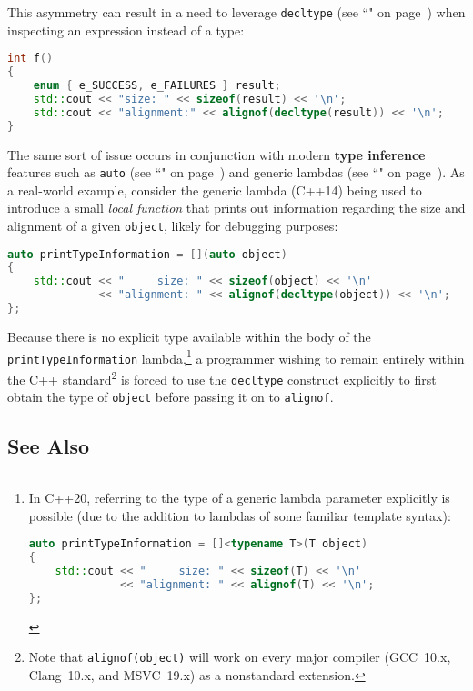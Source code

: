 \noindent This asymmetry can result in a need to leverage
\texttt{decltype} (see ``" on page~\pageref{decltype}) when inspecting an expression instead
of a type:

\begin{lstlisting}[language=C++]
int f()
{
    enum { e_SUCCESS, e_FAILURES } result;
    std::cout << "size: " << sizeof(result) << '\n';
    std::cout << "alignment:" << alignof(decltype(result)) << '\n';
}
\end{lstlisting}
    
\noindent The same sort of issue occurs in conjunction with modern \textbf{type
inference} features such as \texttt{auto} (see ``" on page~\pageref{auto-feature}) and
generic lambdas (see ``" on page~\pageref{genericlambda}). As a real-world example, consider the
generic lambda (C++14) being used to introduce a small
\emph{local function} that prints out information regarding the size and
alignment of a given \texttt{object}, likely for debugging purposes:

\begin{lstlisting}[language=C++]
auto printTypeInformation = [](auto object)
{
    std::cout << "     size: " << sizeof(object) << '\n'
              << "alignment: " << alignof(decltype(object)) << '\n';
};
\end{lstlisting}
    
\noindent Because there is no explicit type available within the body of the
\texttt{printTypeInformation} lambda,{\cprotect\footnote{In C++20, referring to the type of a generic lambda parameter explicitly is possible (due to the addition to lambdas of some familiar template syntax):

\begin{lstlisting}[language=C++, basicstyle={\ttfamily\footnotesize}]
auto printTypeInformation = []<typename T>(T object)
{
    std::cout << "     size: " << sizeof(T) << '\n'
              << "alignment: " << alignof(T) << '\n';
};
\end{lstlisting}
      }} a programmer wishing to remain entirely within the C++
standard{\cprotect\footnote{Note that \texttt{alignof(object)} will work
on every major compiler (GCC~10.x, Clang~10.x, and MSVC~19.x) as a
  nonstandard extension.}} is forced to use the
\texttt{decltype} construct explicitly to first obtain
the type of \texttt{object} before passing it on to \texttt{alignof}.

\subsection[See Also]{See Also}\label{see-also}

